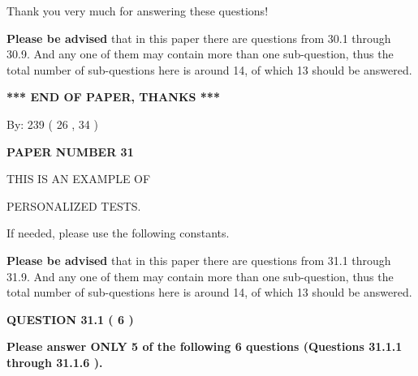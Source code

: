 \documentclass[12pt]{article}
\begin{document}
 
 
 
Thank you very much for answering these questions!
 
{\textbf{\large{Please be advised}}} that in this paper there are questions from
30.1 through
30.9.
And any one of them may contain more than one sub-question, thus the total number
of sub-questions here is around 14, of which
13 should be answered.
 
   
   
   
   
\vspace{1.0in} 
{\textbf{\large{ *** END OF PAPER, THANKS *** }}} 
   
   
\hspace{1.0in} By: 
         239 (          26 ,           34 )
   
   
   
   
\newpage 
\setcounter{page}{ 
    31001 } 
   
   
   
   
 {\textbf{ \Large{ PAPER NUMBER           31  }}}
   
   
\vspace{0.2in}
   
   
   
   
   
   
 \vspace{0.2in}
 
 
{\Huge  THIS IS AN EXAMPLE OF}
 
{\Huge  PERSONALIZED TESTS. }
 
If needed, please use the following constants.
 
 
 
{\textbf{\large{Please be advised}}} that in this paper there are questions from
31.1 through
31.9.
And any one of them may contain more than one sub-question, thus the total number
of sub-questions here is around 14, of which
13 should be answered.
 
\vspace{0.3in}
 
 
   
   
  
\vspace{0.2in}
  
{\textbf{\Large{QUESTION
31.1 
 (           6 )
}}}
  
  
{\textbf{\Large{Please answer ONLY  %
           5  %
 of the following  %
           6  %
 questions (Questions  %
31.1.1 %
 through  %
31.1.6 %
 ). }}}
   
\end{document}
